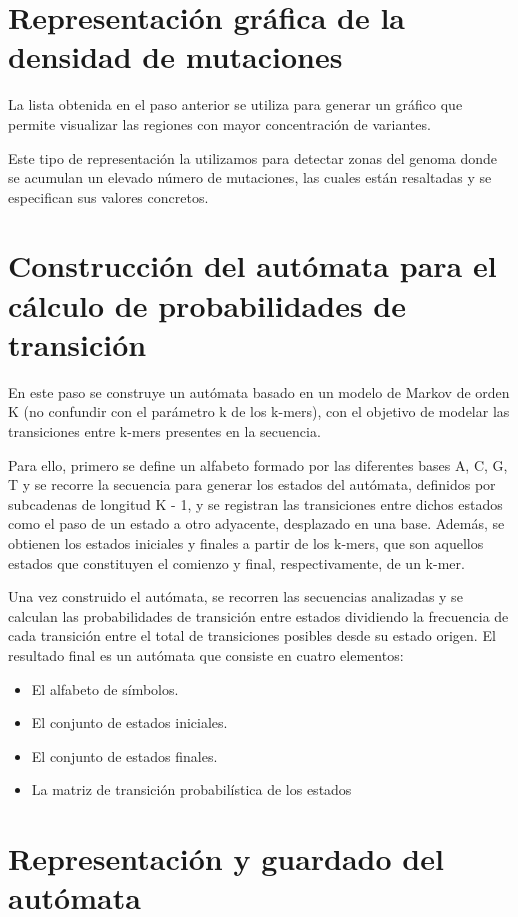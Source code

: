 \documentclass[11pt,spanish,listoffigures,listoftables]{tfgetsinf}
\begin{document}
\section{Representación gráfica de la densidad de mutaciones}

La lista obtenida en el paso anterior se utiliza para generar un gráfico que permite visualizar las regiones con mayor concentración de variantes.

Este tipo de representación la utilizamos para detectar zonas del genoma donde se acumulan un elevado número de mutaciones, las cuales están resaltadas y se especifican sus valores concretos.

\section{Construcción del autómata para el cálculo de probabilidades de transición}

En este paso se construye un autómata basado en un modelo de Markov de orden K (no confundir con el parámetro k de los k-mers), con el objetivo de modelar las transiciones entre k-mers presentes en la secuencia. 

Para ello, primero se define un alfabeto formado por las diferentes bases {A, C, G, T} y se recorre la secuencia para generar los estados del autómata, definidos por subcadenas de longitud K - 1, y se registran las transiciones entre dichos estados como el paso de un estado a otro adyacente, desplazado en una base. Además, se obtienen los estados iniciales y finales a partir de los k-mers, que son aquellos estados que constituyen el comienzo y final, respectivamente, de un k-mer.  

Una vez construido el autómata, se recorren las secuencias analizadas y se calculan las probabilidades de transición entre estados dividiendo la frecuencia de cada transición entre el total de transiciones posibles desde su estado origen. El resultado final es un autómata que consiste en cuatro elementos:  


\begin{itemize}
   \item El alfabeto de símbolos.
   \item El conjunto de estados iniciales.  
   \item El conjunto de estados finales. 
   \item La matriz de transición probabilística de los estados 
\end{itemize}

\section{Representación y guardado del autómata}
\end{document}
